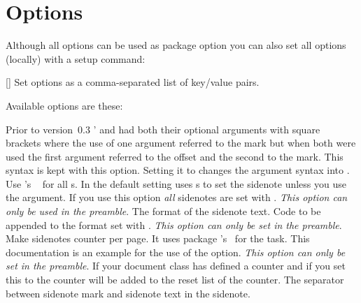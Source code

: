 \documentclass[load-preamble+]{cnltx-doc}
\begin{document}
\section{Options}\label{sec:options}
Although all options can be used as package option you can also set all options
(locally) with a setup command:
\begin{commands}
  []
    Set options as a comma-separated list of key/value pairs.
\end{commands}
Available options are these:
\begin{options}
  \label{key:dblarg}%
    Prior to version~0.3 \snotez'  and  had both
    their optional arguments with square brackets where the use of one argument
    referred to the mark but when both were used the first argument referred
    to the offset and the second to the mark.  This syntax is kept with this
    option.  Setting it to  changes the  argument
    syntax into .
    Use 's ~\cite{pkg:marginnote} for all
    s.  In the default setting  uses
    s to set the sidenote unless you use the 
    argument.  If you use this option \emph{all} sidenotes are set with
    .  \emph{This option can only be used in the preamble}.
    The format of the sidenote text.
  \Default
    Code to be appended to the format set with
    .
    \emph{This option can only be set in the preamble}.  Make sidenotes
    counter per page.  It uses package 's~\cite{bnd:zref}
    for the task. This documentation is an example for the use of the option.
    \emph{This option can only be set in the preamble}. If
    your document class has defined a counter  and if you set
    this to  the  counter will be added to the reset
    list of the  counter.
    The separator between sidenote mark and sidenote text in the sidenote.

\end{options}
\end{document}
